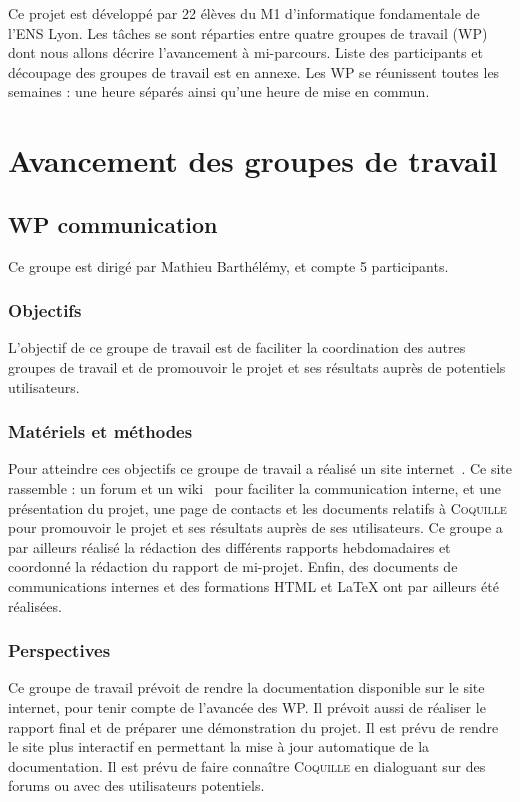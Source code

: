 \documentclass[a4paper,10pt]{article}
\newcommand{\coquille}{\textsc{Coquille}}
\begin{document}
Ce projet est développé par 22 élèves du M1 d'informatique fondamentale de l'ENS Lyon. Les tâches se sont réparties entre quatre groupes de travail (WP) dont nous allons décrire l'avancement à mi-parcours. Liste des participants et découpage des groupes de travail est en annexe. Les WP se réunissent toutes les semaines : une heure séparés ainsi qu'une heure de mise en commun.

\section{Avancement des groupes de travail}

\subsection{WP communication}

Ce groupe est dirigé par Mathieu Barthélémy, et compte 5 participants.

\subsubsection{Objectifs}
L'objectif de ce groupe de travail est de faciliter la coordination des autres groupes de travail et de promouvoir le projet et ses résultats auprès de potentiels utilisateurs.

\subsubsection{Matériels et méthodes}
Pour atteindre ces objectifs ce groupe de travail a réalisé un site internet~\cite{coquille}. Ce site rassemble : un forum et un wiki~\cite{wikicoquille} pour faciliter la communication interne, et une présentation du projet, une page de contacts et les documents relatifs à \coquille{} pour promouvoir le projet et ses résultats auprès de ses utilisateurs. Ce groupe a par ailleurs réalisé la rédaction des différents rapports hebdomadaires et coordonné la rédaction du rapport de mi-projet. Enfin, des documents de communications internes et des formations HTML et \LaTeX{} ont par ailleurs été réalisées.

\subsubsection{Perspectives}
Ce groupe de travail prévoit de rendre la documentation disponible sur le site internet, pour tenir compte de l'avancée des WP. Il prévoit aussi de réaliser le rapport final et de préparer une démonstration du projet. Il est prévu de rendre le site plus interactif en permettant la mise à jour automatique de la documentation. Il est prévu de faire connaître \coquille{} en dialoguant sur des forums ou avec des utilisateurs potentiels.
\end{document}
